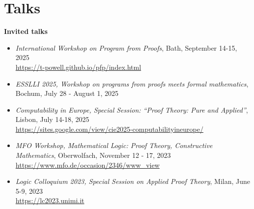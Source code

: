\documentclass[letterpaper,11pt,oneside]{article}
\begin{document}
\section{Talks}
\noindent
\large{\textbf{Invited talks}} 
\normalsize
\begin{itemize}
    \item \emph{International Workshop on Program from Proofs}, 
    Bath, September 14-15, 2025 \\ 
    \url{https://t-powell.github.io/pfp/index.html}
    \item \emph{ESSLLI 2025, Workshop on programs from proofs meets formal mathematics},
    Bochum, July 28 - August 1, 2025 
    \item \emph{Computability in Europe, Special Session: ``Proof Theory: Pure and Applied''},
    Lisbon, July 14-18, 2025 \\ 
    \url{https://sites.google.com/view/cie2025-computabilityineurope/}
    \item \emph{MFO Workshop, Mathematical Logic: Proof Theory, Constructive Mathematics},
    Oberwolfach, November 12 - 17, 2023 \\ 
    \url{https://www.mfo.de/occasion/2346/www_view} 
    \item \emph{Logic Colloquium 2023, Special Session on Applied Proof Theory},
    Milan, June 5-9, 2023 \\ 
    \url{https://lc2023.unimi.it}
\end{itemize}
\normalsize
\mbox{}
\end{document}
